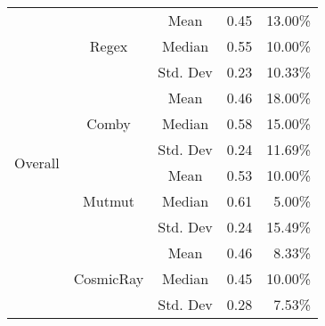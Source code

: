 \documentclass[sigconf,review, anonymous]{acmart}
\begin{document}
\begin{table}[htbp]
{\begin{tabular}{|c|c|r|r|r|r|}
\multirow{12}{*}{Overall} & \multirow{3}{*}{Regex} & \multicolumn{2}{c|}{Mean} & 0.45  & 13.00\%\\\cline{3-6}
    &   &  \multicolumn{2}{c|}{Median} & 0.55 & 10.00\%\\\cline{3-6}
    &   &  \multicolumn{2}{c|}{Std. Dev} & 0.23 & 10.33\%\\\cline{2-6}

 & \multirow{3}{*}{Comby} & \multicolumn{2}{c|}{Mean} & 0.46 & 18.00\%\\\cline{3-6}
    &   &  \multicolumn{2}{c|}{Median} & 0.58 & 15.00\%\\\cline{3-6}
    &   &  \multicolumn{2}{c|}{Std. Dev} & 0.24 & 11.69\%\\\cline{2-6}

 & \multirow{3}{*}{Mutmut} & \multicolumn{2}{c|}{Mean} & 0.53 & 10.00\%\\\cline{3-6}
    &   &  \multicolumn{2}{c|}{Median} & 0.61 & 5.00\%\\\cline{3-6}
    &   &  \multicolumn{2}{c|}{Std. Dev} & 0.24 & 15.49\%\\\cline{2-6}
    
 & \multirow{3}{*}{CosmicRay} & \multicolumn{2}{c|}{Mean} & 0.46 & 8.33\%\\\cline{3-6}
    &   &  \multicolumn{2}{c|}{Median} & 0.45 & 10.00\%\\\cline{3-6}
    &   &  \multicolumn{2}{c|}{Std. Dev} & 0.28 & 7.53\%\\ \hline
    
\end{tabular}
}
\end{table}


\end{document}
